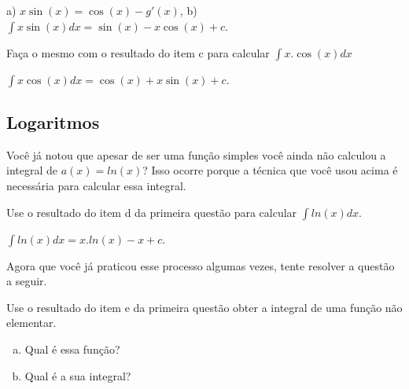 \documentclass[main_estudante.tex]{subfiles}
\begin{document}
\begin{gabarito}
	\begin{gabaritoQuestao}
		a) $x\sin(x)=\cos(x)-g'(x)$, b) $\int x\sin(x) dx = \sin(x)-x\cos(x)+c$.
	\end{gabaritoQuestao}
\end{gabarito}

\begin{questao}
Faça o mesmo com o resultado do item c para calcular $\int x . \cos(x) dx$
\end{questao}

\begin{gabarito}
	\begin{gabaritoQuestao}
		$\int x\cos(x) dx = \cos(x)+x\sin(x)+c$.
	\end{gabaritoQuestao}
\end{gabarito}

\subsection*{Logaritmos}

Você já notou que apesar de ser uma função simples você ainda não calculou a integral de $a(x)=ln(x)$? Isso ocorre porque a técnica que você usou acima é necessária para calcular essa integral.

\begin{questao}
Use o resultado do item d da primeira questão para calcular $\int ln(x) dx$.
\end{questao}

\begin{gabarito}
	\begin{gabaritoQuestao}
		$\int ln(x) dx = x.ln(x)-x+c$.
	\end{gabaritoQuestao}
\end{gabarito}

Agora que você já praticou esse processo algumas vezes, tente resolver a questão a seguir.


\begin{questao}
Use o resultado do item e da primeira questão obter a integral de uma função não elementar.
\begin{enumerate}[a)]
\item Qual é essa função?
\item Qual é a sua integral?
\end{enumerate}
\end{questao}
\end{document}
